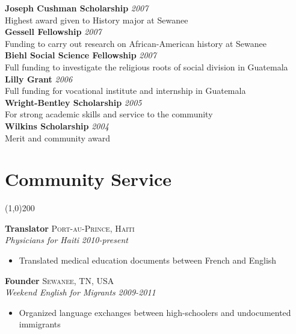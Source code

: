 \documentclass[11pt]{article}
\begin{document}
\noindent \textbf{Joseph Cushman Scholarship}  \hfill \emph{2007}\\
\noindent Highest award given to History major at Sewanee \\

\noindent \textbf{Gessell Fellowship}  \hfill \emph{2007}\\
\noindent Funding to carry out research on African-American history at Sewanee\\

\noindent \textbf{Biehl Social Science Fellowship}  \hfill \emph{2007}\\
\noindent Full funding to investigate the religious roots of social division in Guatemala\\

\noindent \textbf{Lilly Grant}  \hfill \emph{2006}\\
\noindent Full funding for vocational institute and internship in Guatemala\\

\noindent \textbf{Wright-Bentley Scholarship}  \hfill \emph{2005}\\
\noindent For strong academic skills and service to the community\\

\noindent \textbf{Wilkins Scholarship}  \hfill \emph{2004}\\
\noindent Merit and community award\\

\newpage

\section*{Community Service} %
\vspace{-7mm}
\line(1,0){200}
\vspace{2mm}

\noindent \textbf{Translator} \hfill \textsc{Port-au-Prince, Haiti}\\
\noindent \emph{Physicians for Haiti} \hfill \emph{2010-present}
\vspace{-2mm}
\begin{itemize}\itemsep0pt \parskip0pt 
\item Translated medical education documents between French and English
\end{itemize}

\noindent \textbf{Founder} \hfill \textsc{Sewanee, TN, USA}\\
\noindent \emph{Weekend English for Migrants} \hfill \emph{2009-2011}
\vspace{-2mm}
\begin{itemize}\itemsep0pt \parskip0pt 
\item Organized language exchanges between high-schoolers and undocumented immigrants
\end{itemize}
\end{document}
